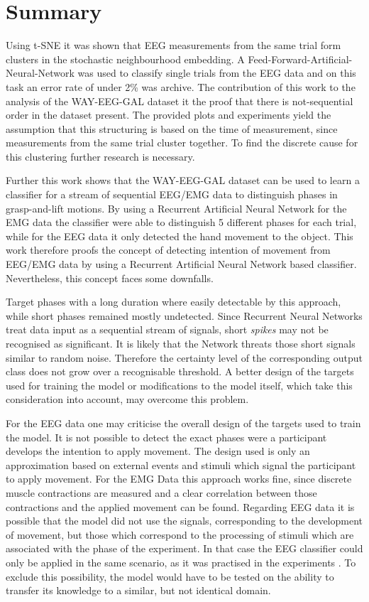 \documentclass{article} %
\begin{document}
\section{Summary}
Using t-SNE it was shown that EEG measurements from the same trial form clusters in the stochastic neighbourhood embedding.
A Feed-Forward-Artificial-Neural-Network was used to classify single trials from the EEG data and on this task an error rate of under 2\% was archive.
The contribution of this work to the analysis of the WAY-EEG-GAL dataset it the proof that there is not-sequential order in the dataset present.
The provided plots and experiments yield the assumption that this structuring is based on the time of measurement, since measurements from the same trial cluster together.
To find the discrete cause for this clustering further research is necessary.

Further this work shows that the WAY-EEG-GAL dataset can be used to learn a classifier for a stream of sequential EEG/EMG data to distinguish phases in grasp-and-lift motions.
By using a Recurrent Artificial Neural Network for the EMG data the classifier were able to distinguish 5 different phases for each trial,
while for the EEG data it only detected the hand movement to the object.
This work therefore proofs the concept of detecting intention of movement from EEG/EMG data by using a Recurrent Artificial Neural Network based classifier.
Nevertheless, this concept faces some downfalls.

Target phases with a long duration where easily detectable by this approach, while short phases remained mostly undetected.
Since Recurrent Neural Networks treat data input as a sequential stream of signals, short \textit{spikes} may not be recognised as significant.
It is likely that the Network threats those short signals similar to random noise.
Therefore the certainty level of the corresponding output class does not grow over a recognisable threshold. 
A better design of the targets used for training the model or modifications to the model itself, which take this consideration into account, may overcome this problem.

For the EEG data one may criticise the overall design of the targets used to train the model.
It is not possible to detect the exact phases were a participant develops the intention to apply movement.
The design used is only an approximation based on external events and stimuli which signal the participant to apply movement.
For the EMG Data this approach works fine, since discrete muscle contractions are measured and a clear correlation between those contractions and the applied movement can be found.
Regarding EEG data it is possible that the model did not use the signals, corresponding to the development of movement, but those which correspond to the processing of stimuli which are associated with the phase of the experiment.
In that case the EEG classifier could only be applied in the same scenario, as it was practised in the experiments \cite{nature}.
To exclude this possibility, the model would have to be tested on the ability to transfer its knowledge to a similar, but not identical domain.
\end{document}
